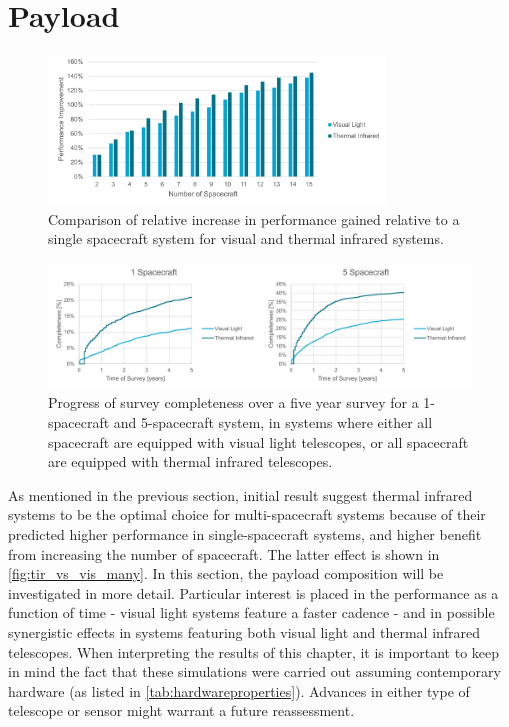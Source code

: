 \section{Payload}
\label{sec:results_payload}
\begin{figure}[htbp]
 \centering
 \includegraphics[width=0.8\textwidth]{img/tir_vs_vis_many.pdf}
 \caption{Comparison of relative increase in performance gained relative to a single spacecraft system for visual and thermal infrared systems.}
 \label{fig:tir_vs_vis_many}
\end{figure}

\begin{figure}[htbp]
 \centering
 \includegraphics[width=1.0\textwidth]{img/tir_vs_vis_1_5.pdf}
 \caption{Progress of survey completeness over a five year survey for a 1-spacecraft and 5-spacecraft system, in systems where either all spacecraft are equipped with visual light telescopes, or all spacecraft are equipped with thermal infrared telescopes.}
 \label{fig:tir_vs_vis_nohybrid}
\end{figure}


As mentioned in the previous section, initial result suggest thermal infrared systems to be the optimal choice for multi-spacecraft systems because of their predicted higher performance in single-spacecraft systems, and higher benefit from increasing the number of spacecraft. The latter effect is shown in \autoref{fig:tir_vs_vis_many}. In this section, the payload composition will be investigated in more detail. Particular interest is placed in the performance as a function of time - visual light systems feature a faster cadence - and in possible synergistic effects in systems featuring both visual light and thermal infrared telescopes. When interpreting the results of this chapter, it is important to keep in mind the fact that these simulations were carried out assuming contemporary hardware (as listed in \autoref{tab:hardwareproperties}). Advances in either type of telescope or sensor might warrant a future reassessment.\\

